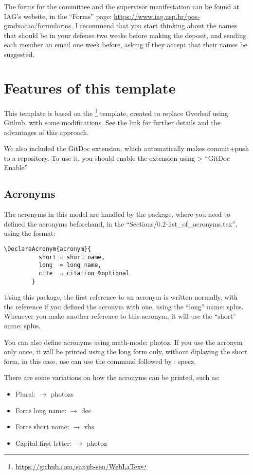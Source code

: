   The forms for the committee and the supervisor manifestation can be found at IAG's website, in the ``Forms'' page: \url{https://www.iag.usp.br/pos-graduacao/formularios}. I recommend that you start thinking about the names that should be in your defense two weeks before making the deposit, and sending each member an email one week before, asking if they accept that their names be suggested.

  \section{Features of this template}

    This template is based on the \footnote{\url{https://github.com/sanjib-sen/WebLaTex}} template, created to replace Overleaf using Github, with some modifications. See the link for further details and the advantages of this approach.

    We also included the GitDoc extension, which automatically makes commit+push to a repository. To use it, you should enable the extension using  > ``GitDoc Enable''
  
    \subsection{Acronyms}
      The acronyms in this model are handled by the  package, where you need to defined the acronyms beforehand, in the ``Sections/0.2-list\_of\_acronyms.tex'', using the format:

      \begin{lstlisting}[autogobble]
        \DeclareAcronym{acronym}{
          short = short name,
          long  = long name,
          cite  = citation %optional
        }
    \end{lstlisting}

    Using this package, the first reference to an acronym is written normally, with the reference if you defined the acronym with one, using the ``long'' name: \ac{splus}. Whenever you make another reference to this acronym, it will use the ``short'' name: \ac{splus}.
    
    You can also define acronyms using math-mode: \ac{photoz}. If you use the acronym only once, it will be printed using the long form only, without diplaying the short form, in this case, use can use the  command followed by  : \ac{specz}.

    There are some variations on how the acronyms can be printed, such as:
    \begin{itemize}
      \item Plural:  $\rightarrow$ \acp{photoz}
      \item Force long name:  $\rightarrow$ \acl{des}
      \item Force short name:  $\rightarrow$ \acs{vhs}
      \item Capital first letter:  $\rightarrow$ \Ac{photoz}
    \end{itemize}

